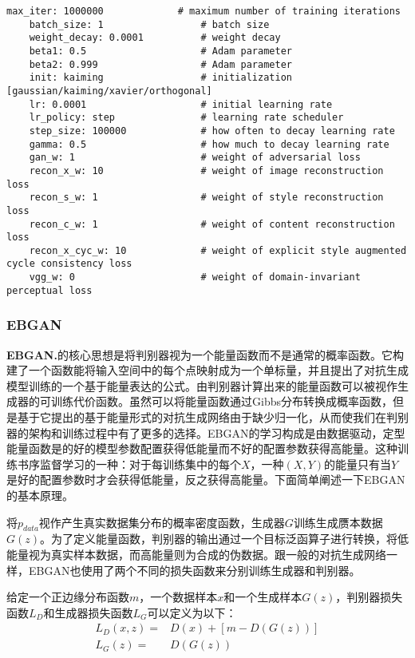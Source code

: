 \begin{lstlisting}[basicstyle=\small, caption={MUNIT主要优化参数配置}, captionpos=b]
    max_iter: 1000000             # maximum number of training iterations
    batch_size: 1                 # batch size
    weight_decay: 0.0001          # weight decay
    beta1: 0.5                    # Adam parameter
    beta2: 0.999                  # Adam parameter
    init: kaiming                 # initialization [gaussian/kaiming/xavier/orthogonal]
    lr: 0.0001                    # initial learning rate
    lr_policy: step               # learning rate scheduler
    step_size: 100000             # how often to decay learning rate
    gamma: 0.5                    # how much to decay learning rate
    gan_w: 1                      # weight of adversarial loss
    recon_x_w: 10                 # weight of image reconstruction loss
    recon_s_w: 1                  # weight of style reconstruction loss
    recon_c_w: 1                  # weight of content reconstruction loss
    recon_x_cyc_w: 10             # weight of explicit style augmented cycle consistency loss
    vgg_w: 0                      # weight of domain-invariant perceptual loss
\end{lstlisting}

\subsubsection[EBGAN]{EBGAN}

\textbf{EBGAN.}\cite{ebgan}\quad 的核心思想是将判别器视为一个能量函数而不是通常的概率函数。它构建了一个函数能将输入空间中的每个点映射成为一个单标量，并且提出了对抗生成模型训练的一个基于能量表达的公式。由判别器计算出来的能量函数可以被视作生成器的可训练代价函数。虽然可以将能量函数通过Gibbs分布转换成概率函数，但是基于它提出的基于能量形式的对抗生成网络由于缺少归一化，从而使我们在判别器的架构和训练过程中有了更多的选择。EBGAN的学习构成是由数据驱动，定型能量函数是的好的模型参数配置获得低能量而不好的配置参数获得高能量。这种训练书序监督学习的一种：对于每训练集中的每个$X$，一种$(X,Y)$的能量只有当$Y$是好的配置参数时才会获得低能量，反之获得高能量。下面简单阐述一下EBGAN的基本原理。

将$p_{data}$视作产生真实数据集分布的概率密度函数，生成器$G$训练生成赝本数据$G(z)$。为了定义能量函数，判别器的输出通过一个目标泛函算子进行转换，将低能量视为真实样本数据，而高能量则为合成的伪数据。跟一般的对抗生成网络一样，EBGAN也使用了两个不同的损失函数来分别训练生成器和判别器。

给定一个正边缘分布函数$m$，一个数据样本$x$和一个生成样本$G(z)$，判别器损失函数$L_D$和生成器损失函数$L_G$可以定义为以下：
\begin{equation}
    \begin{align*}
    L_D(x, z) = & D(x) + [m - D(G(z))] \\
    L_G(z) = & D(G(z))
    \end{align*}
\end{equation}

